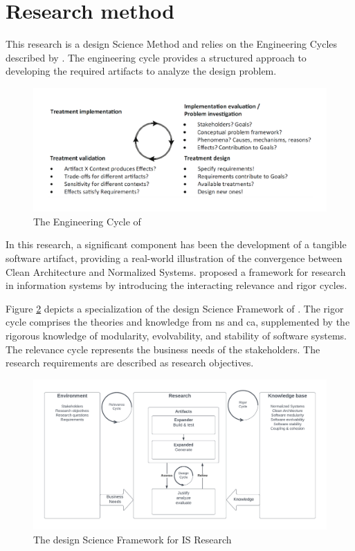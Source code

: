 \section{Research method} \label{sec_research_method}

This research is a design Science Method and relies on the Engineering Cycles described
by \textcite{wieringa_design_2014}. The engineering cycle provides a structured approach
to developing the required artifacts to analyze the design problem.

\begin{figure}[H]
    \centering
    \includegraphics[width=1\textwidth]{figures/engineering_cycle.pdf}
    \caption[Engineering cycle]{The Engineering Cycle of \textcite{wieringa_design_2014}}
    \label{fig_engineering_cycle}
\end{figure}

In this research, a significant component has been the development of a tangible software
artifact, providing a real-world illustration of the convergence between Clean
Architecture and Normalized Systems. \textcite{hevner_design_2004} proposed a framework
for research in information systems by introducing the interacting relevance and rigor
cycles.

Figure \ref{fig_dsr} depicts a specialization of the design Science Framework of
\textcite{hevner_design_2004}. The rigor cycle comprises the theories and knowledge from
\gls{ns} and \gls{ca}, supplemented by the rigorous knowledge of modularity, evolvability,
and stability of software systems. The relevance cycle represents the business needs of
the stakeholders. The research requirements are described as research objectives.

\begin{figure}[H]
    \centering
    \includegraphics[width=1\textwidth]{figures/rigor_relevance_cycle.pdf}
    \caption[Design Science Framework for IS Research]{The design Science Framework for IS Research}
    \label{fig_dsr}
\end{figure}